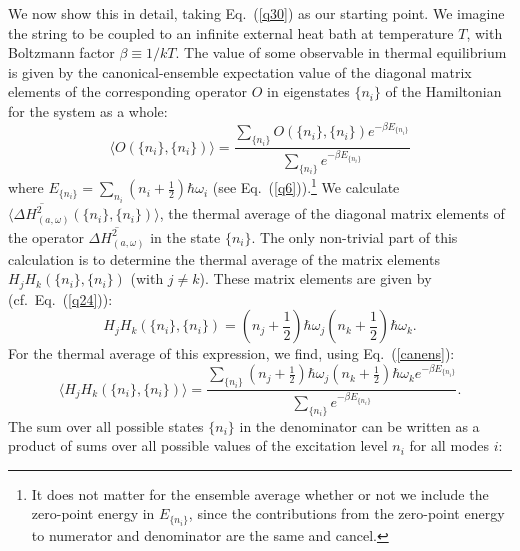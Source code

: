 \documentclass{elsart}
\begin{document}
{We now show this in detail,  taking Eq.\ (\ref{q30}) as our starting point. We imagine the string to be coupled to an infinite external heat bath at temperature
$T$, with Boltzmann factor $\beta \equiv 1/kT$. The value of some observable in thermal equilibrium is given by the canonical-ensemble expectation value of the diagonal matrix elements of the corresponding operator $O$ in eigenstates $\{ n_i \}$ of the Hamiltonian for the system as a whole:
\begin{equation}
  \langle O(\{ n_i \}, \{ n_i \}) \rangle = \frac{ \displaystyle{ \sum_{ \{ n_i \} } } O(\{ n_i \}, \{ n_i \}) 
  e^{ \displaystyle{ -\beta E_{ \{ n_i \}}}}}{ \displaystyle{ \sum_{\{ n_i \}}} e^{ \displaystyle{ -\beta E_{\{ n_i \}}}}}
  \label{canens}
  \end{equation}
 where $E_{ \{ n_i \}} = \sum_{n_i} \left( n_i + \frac{1}{2} \right) \hbar \omega_i$ (see Eq.\  (\ref{q6})).\footnote{It does not matter for the ensemble average whether or not we include the zero-point energy in $E_{ \{ n_i \}}$, since the contributions from the zero-point energy  to numerator and  denominator are the same and cancel.} We calculate $\langle \overline{\Delta H_{(a, \omega)}^2} (\{ n_i \}, \{ n_i \}) \rangle$, the thermal average of the diagonal matrix elements of the operator $\overline{\Delta H_{(a, \omega)}^2}$ in the state $\{ n_i \}$. The only non-trivial part of this calculation is to determine the thermal average of the matrix elements $H_j H_k(\{ n_i \}, \{ n_i \})$ (with $j \neq k$). These matrix elements are given by (cf.\ Eq.\ (\ref{q24})):
\begin{equation}
H_j H_k (\{ n_i \}, \{ n_i \}) = \left( n_j + \frac{1}{2} \right) \hbar \omega_j  \left( n_k + \frac{1}{2} \right) \hbar \omega_k.
\label{q32}
\end{equation}
For the thermal average of this expression, we find, using Eq.\ (\ref{canens}):
\begin{equation}
\langle H_j H_k (\{ n_i \}, \{ n_i \}) \rangle =  \frac{ \displaystyle{ \sum_{ \{ n_{i} \} } }
\left(n_{j}+ \displaystyle{ \frac{1}{2}} \right)\hbar\omega_{j}
\left(n_{k}+ \displaystyle{ \frac{1}{2}} \right)\hbar\omega_{k}
e^{ \displaystyle{ -\beta E_{ \{ n_{i} \} }} }}{\displaystyle { \sum_{ \{ n_{i} \} } } 
e^{ \displaystyle{  -\beta E_{\{ n_{i} \}} } } }.
\label{q33} 
\end{equation}
The sum over all possible states $\{ n_i \}$ in the denominator can be written as a product of sums over all possible values of the excitation level $n_i$ for all modes $i$:
\begin{equation}

\end{equation}}
\end{document}
